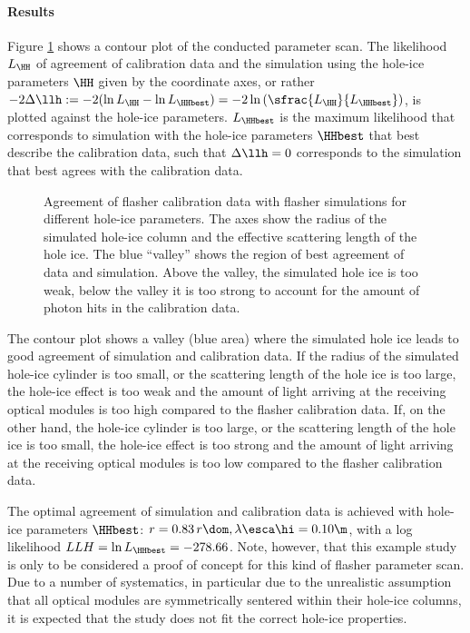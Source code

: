\paragraph{Results}
Figure \ref{fig:ut4nao7X} shows a contour plot of the conducted parameter scan. The likelihood $L_\HH$ of agreement of calibration data and the simulation using the hole-ice parameters $\HH$ given by the coordinate axes, or rather $-2\Delta\llh:= -2(\ln L_\HH - \ln L_\HHbest) = -2 \ln \left(\sfrac{L_\HH}{L_\HHbest}\right)$, is plotted against the hole-ice parameters. $L_\HHbest$ is the maximum likelihood that corresponds to simulation with the hole-ice parameters $\HHbest$ that best describe the calibration data, such that $\Delta\llh = 0$ corresponds to the simulation that best agrees with the calibration data.

\begin{figure}[htbp]
  \caption{Agreement of flasher calibration data with flasher simulations for different hole-ice parameters. The axes show the radius of the simulated hole-ice column and the effective scattering length of the hole ice. The blue ``valley'' shows the region of best agreement of data and simulation. Above the valley, the simulated hole ice is too weak, below the valley it is too strong to account for the amount of photon hits in the calibration data.}
  \label{fig:ut4nao7X}
\end{figure}

The contour plot shows a valley (blue area) where the simulated hole ice leads to good agreement of simulation and calibration data.
If the radius of the simulated hole-ice cylinder is too small, or the scattering length of the hole ice is too large, the hole-ice effect is too weak and the amount of light arriving at the receiving optical modules is too high compared to the flasher calibration data.
If, on the other hand, the hole-ice cylinder is too large, or the scattering length of the hole ice is too small, the hole-ice effect is too strong and the amount of light arriving at the receiving optical modules is too low compared to the flasher calibration data.

The optimal agreement of simulation and calibration data is achieved with hole-ice parameters $\HHbest$: $r = 0.83\,r\dom, \lambda\esca\hi = 0.10\m$, with a log likelihood $LLH = \ln L_\HHbest = -278.66$. Note, however, that this example study is only to be considered a proof of concept for this kind of flasher parameter scan. Due to a number of systematics, in particular due to the unrealistic assumption that all optical modules are symmetrically sentered within their hole-ice columns, it is expected that the study does not fit the correct hole-ice properties.

